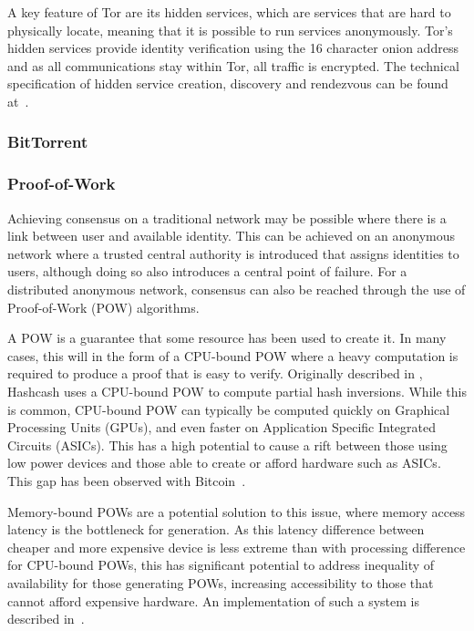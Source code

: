 			A key feature of Tor are its hidden services, which are services that are hard to physically locate, meaning that it is possible to run services anonymously. Tor's hidden services provide identity verification using the 16 character onion address and as all communications stay within Tor, all traffic is encrypted. The technical specification of hidden service creation, discovery and rendezvous can be found at~\cite{tor_rend}.
		\subsubsection*{BitTorrent}
		\subsubsection*{Proof-of-Work}
			Achieving consensus on a traditional network may be possible where there is a link between user and available identity. This can be achieved on an anonymous network where a trusted central authority is introduced that assigns identities to users, although doing so also introduces a central point of failure. For a distributed anonymous network, consensus can also be reached through the use of Proof-of-Work (POW) algorithms.
			
			A POW is a guarantee that some resource has been used to create it. In many cases, this will in the form of a CPU-bound POW where a heavy computation is required to produce a proof that is easy to verify. Originally described in \cite{back2002hashcash}, Hashcash uses a CPU-bound POW to compute partial hash inversions. While this is common, CPU-bound POW can typically be computed quickly on Graphical Processing Units (GPUs), and even faster on Application Specific Integrated Circuits (ASICs). This has a high potential to cause a rift between those using low power devices and those able to create or afford hardware such as ASICs. This gap has been observed with Bitcoin~\cite{peck2013bitcoin}.
			
			Memory-bound POWs are a potential solution to this issue, where memory access latency is the bottleneck for generation. As this latency difference between cheaper and more expensive device is less extreme than with processing difference for CPU-bound POWs, this has significant potential to address inequality of availability for those generating POWs, increasing accessibility to those that cannot afford expensive hardware. An implementation of such a system is described in~\cite{cuckoo}.
